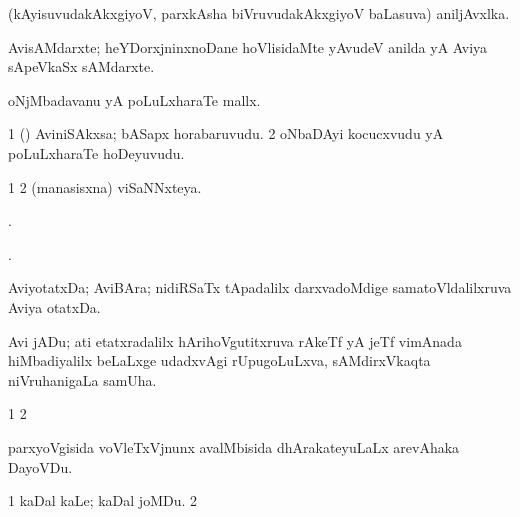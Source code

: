\bentry
{} 
\gl{\nA}
\expl{}
\bmng
 (kAyisuvudakAkxgiyoV, parxkAsha biVruvudakAkxgiyoV baLasuva) aniljAvxlka. 
\emng
\eentry

\bentry
{}
\gl{\nA}
\expl{}
\bmng
 AvisAMdarxte; heYDorxjninxnoDane hoVlisidaMte yAvudeV anilda yA Aviya sApeVkaSx sAMdarxte. 
\emng
\eentry

\bentry
{} 
\gl{\nA}
\expl{}
\bmng
 oNjMbadavanu yA poLuLxharaTe mallx. 
\emng
\eentry

\bentry
{} 
\gl{\nA}
\expl{}
\bmng
\bnum
\num{1} (\viparx) AviniSAkxsa; bASapx horabaruvudu. 
\num{2} oNbaDAyi kocucxvudu yA poLuLxharaTe hoDeyuvudu. 
\enum
\emng
\eentry

\bentry
{} 
\gl{\gu}
\expl{}
\bmng
\bnum
\num{1}  
\num{2} (manasisxna) viSaNNxteya. 
\enum
\emng
\eentry

\bentry
{} 
\gl{\gu}
\expl{}
\bmng
 . 
\emng
\eentry

\bentry
{} 
\gl{\kirxvi}
\expl{}
\bmng
 . 
\emng
\eentry

\bentry
{}
\gl{\nA}
\expl{}
\bmng
 AviyotatxDa; AviBAra; nidiRSaTx tApadalilx darxvadoMdige samatoVldalilxruva Aviya otatxDa. 
\emng
\eentry

\bentry
{}
\gl{\nA}
\expl{}
\bmng
 Avi jADu; ati etatxradalilx hArihoVgutitxruva rAkeTf yA jeTf vimAnada hiMbadiyalilx beLaLxge udadxvAgi rUpugoLuLxva, sAMdirxVkaqta niVruhanigaLa samUha. 
\emng
\eentry

\bentry
{} 
\gl{\gu}
\expl{}
\bmng
\emng
\eentry

\bentry 
{}
\gl{\saMkiSx}
\expl{}
\bmng
\bnum
\num{1}  
\num{2}  
\enum
\emng
\eentry

\bentry
{} 
\gl{\nA}
\expl{}
\bmng
 parxyoVgisida voVleTxVjnunx avalMbisida dhArakateyuLaLx arevAhaka DayoVDu. 
\emng
\eentry

\bentry
{} 
\gl{\nA}
\expl{}
\bmng
\bnum
\num{1} kaDal kaLe; kaDal joMDu. 
\num{2}  
\enum
\emng
\eentry

